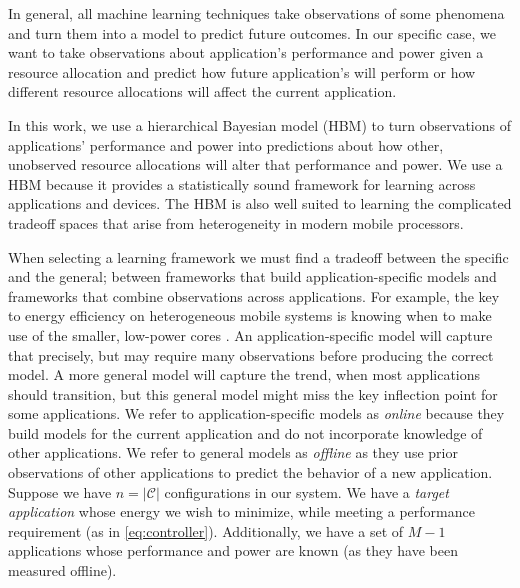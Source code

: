 In general, all machine learning techniques take observations of some
phenomena and turn them into a model to predict future outcomes.  In
our specific case, we want to take observations about application's
performance and power given a resource allocation and predict how
future application's will perform or how different resource
allocations will affect the current application.

In this work, we use a hierarchical Bayesian model (HBM) to turn
observations of applications' performance and power into predictions
about how other, unobserved resource allocations will alter that
performance and power.  We use a HBM because it provides a
statistically sound framework for learning across applications and
devices.  The HBM is also well suited to learning the complicated
tradeoff spaces that arise from heterogeneity in modern mobile
processors.

When selecting a learning framework we must find a tradeoff between
the specific and the general; \ie between frameworks that build
application-specific models and frameworks that combine observations
across applications.  For example, the key to energy efficiency on
heterogeneous mobile systems is knowing when to make use of the
smaller, low-power cores \cite{}.  An application-specific model will
capture that precisely, but may require many observations before
producing the correct model.  A more general model will capture the
trend, \eg when most applications should transition, but this general
model might miss the key inflection point for some applications.  We
refer to application-specific models as \emph{online} because they
build models for the current application and do not incorporate
knowledge of other applications.  We refer to general models as
\emph{offline} as they use prior observations of other applications to
predict the behavior of a new application.
Suppose we have $n = |\mathcal{C}|$ configurations in our system.  We
have a \textit{target application} whose energy we wish to minimize,
while meeting a performance requirement (as in \eqref{eq:controller}).
Additionally, we have a set of $M-1$ applications whose performance
and power are known (as they have been measured offline).

